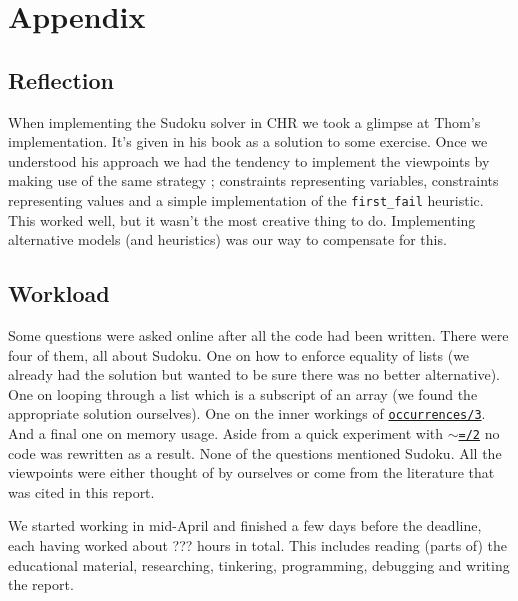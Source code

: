 \section*{Appendix}
\label{sec:appendix}

\subsection*{Reflection}\label{sec:reflection}

When implementing the Sudoku solver in CHR we took a glimpse at Thom's implementation. It's given in his book as a solution to some exercise. Once we understood his approach we had the tendency to implement the viewpoints by making use of the same strategy ; constraints representing variables, constraints representing values and a simple implementation of the \texttt{first\_fail} heuristic. This worked well, but it wasn't the most creative thing to do. Implementing alternative models (and heuristics) was our way to compensate for this.

\subsection*{Workload}\label{sec:workload}

Some questions were asked online after all the code had been written. There were four of them, all about Sudoku. One on how to enforce equality of lists (we already had the solution but wanted to be sure there was no better alternative). One on looping through a list which is a subscript of an array (we found the appropriate solution ourselves). One on the inner workings of \href{http://eclipseclp.org/doc/bips/lib/ic_global/occurrences-3.html}{\texttt{occurrences/3}}. And a final one on memory usage. Aside from a quick experiment with \href{https://eclipseclp.org/doc/bips/kernel/termcomp/TE-2.html}{\texttt{$\sim$=/2}} no code was rewritten as a result. None of the questions mentioned Sudoku. All the viewpoints were either thought of by ourselves or come from the literature that was cited in this report.\\\par

We started working in mid-April and finished a few days before the deadline, each having worked about ??? hours in total. This includes reading (parts of) the educational material, researching, tinkering, programming, debugging and writing the report.

